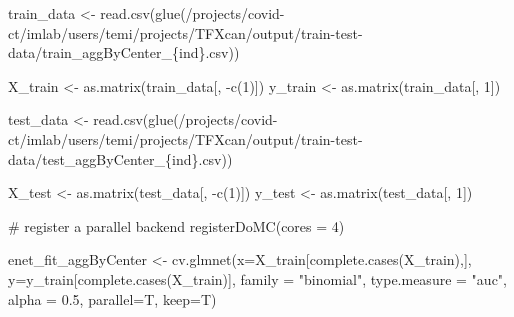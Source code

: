 \documentclass[
  letterpaper,
  DIV=11,
  numbers=noendperiod]{scrartcl}
\newenvironment{Shaded}{\begin{snugshade}}{\end{snugshade}}
\newcommand{\AttributeTok}[1]{\textcolor[rgb]{0.40,0.45,0.13}{#1}}
\newcommand{\CommentTok}[1]{\textcolor[rgb]{0.37,0.37,0.37}{#1}}
\newcommand{\DecValTok}[1]{\textcolor[rgb]{0.68,0.00,0.00}{#1}}
\newcommand{\FloatTok}[1]{\textcolor[rgb]{0.68,0.00,0.00}{#1}}
\newcommand{\FunctionTok}[1]{\textcolor[rgb]{0.28,0.35,0.67}{#1}}
\newcommand{\NormalTok}[1]{\textcolor[rgb]{0.00,0.23,0.31}{#1}}
\newcommand{\OtherTok}[1]{\textcolor[rgb]{0.00,0.23,0.31}{#1}}
\newcommand{\SpecialCharTok}[1]{\textcolor[rgb]{0.37,0.37,0.37}{#1}}
\newcommand{\StringTok}[1]{\textcolor[rgb]{0.13,0.47,0.30}{#1}}
\begin{document}
\begin{Shaded}
\begin{Highlighting}[]
\NormalTok{train\_data }\OtherTok{\textless{}{-}} \FunctionTok{read.csv}\NormalTok{(}\FunctionTok{glue}\NormalTok{(}\StringTok{\textquotesingle{}/projects/covid{-}ct/imlab/users/temi/projects/TFXcan/output/train{-}test{-}data/train\_aggByCenter\_\{ind\}.csv\textquotesingle{}}\NormalTok{))}

\NormalTok{X\_train }\OtherTok{\textless{}{-}} \FunctionTok{as.matrix}\NormalTok{(train\_data[, }\SpecialCharTok{{-}}\FunctionTok{c}\NormalTok{(}\DecValTok{1}\NormalTok{)])}
\NormalTok{y\_train }\OtherTok{\textless{}{-}} \FunctionTok{as.matrix}\NormalTok{(train\_data[, }\DecValTok{1}\NormalTok{])}

\NormalTok{test\_data }\OtherTok{\textless{}{-}} \FunctionTok{read.csv}\NormalTok{(}\FunctionTok{glue}\NormalTok{(}\StringTok{\textquotesingle{}/projects/covid{-}ct/imlab/users/temi/projects/TFXcan/output/train{-}test{-}data/test\_aggByCenter\_\{ind\}.csv\textquotesingle{}}\NormalTok{))}

\NormalTok{X\_test }\OtherTok{\textless{}{-}} \FunctionTok{as.matrix}\NormalTok{(test\_data[, }\SpecialCharTok{{-}}\FunctionTok{c}\NormalTok{(}\DecValTok{1}\NormalTok{)])}
\NormalTok{y\_test }\OtherTok{\textless{}{-}} \FunctionTok{as.matrix}\NormalTok{(test\_data[, }\DecValTok{1}\NormalTok{])}
\end{Highlighting}
\end{Shaded}

\begin{Shaded}
\begin{Highlighting}[]
\CommentTok{\# register a parallel backend }
\FunctionTok{registerDoMC}\NormalTok{(}\AttributeTok{cores =} \DecValTok{4}\NormalTok{)}
\end{Highlighting}
\end{Shaded}

\begin{Shaded}
\begin{Highlighting}[]
\NormalTok{enet\_fit\_aggByCenter }\OtherTok{\textless{}{-}} \FunctionTok{cv.glmnet}\NormalTok{(}\AttributeTok{x=}\NormalTok{X\_train[}\FunctionTok{complete.cases}\NormalTok{(X\_train),], }\AttributeTok{y=}\NormalTok{y\_train[}\FunctionTok{complete.cases}\NormalTok{(X\_train)], }\AttributeTok{family =} \StringTok{"binomial"}\NormalTok{, }
\AttributeTok{type.measure =} \StringTok{"auc"}\NormalTok{, }\AttributeTok{alpha =} \FloatTok{0.5}\NormalTok{, }\AttributeTok{parallel=}\NormalTok{T, }\AttributeTok{keep=}\NormalTok{T)}
\end{Highlighting}
\end{Shaded}
\end{document}
